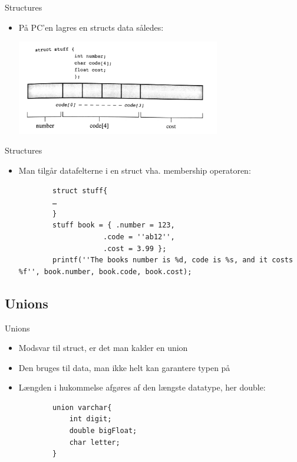 \documentclass{beamer}
\begin{document}
\begin{frame}[fragile]{Structures}
	\begin{itemize}
		\item{På PC'en lagres en structs data således:}
		\begin{center}
		\includegraphics[width=0.7\textwidth]{assets/struct_representation.jpg}
		\end{center}
	\end{itemize}
\end{frame}


\begin{frame}[fragile]{Structures}
	\begin{itemize}
		\item{Man tilgår datafelterne i en struct vha. membership operatoren:}
		\begin{lstlisting}
		struct stuff{
		…
		}
		stuff book = { .number = 123,
					.code = ''ab12'',
					.cost = 3.99 };
		printf(''The books number is %d, code is %s, and it costs %f'', book.number, book.code, book.cost);
		\end{lstlisting}
	\end{itemize}
\end{frame}

\subsection{Unions}

\begin{frame}[fragile]{Unions}
	\begin{itemize}
		\item{Modsvar til {\color{C_darkblue}struct}, er det man kalder en {\color{C_darkblue}union}}
		\item{Den bruges til data, man ikke helt kan garantere typen på}
		\item{Længden i hukommelse afgøres af den længste datatype, her double:}
		\begin{lstlisting}
		union varchar{
			int digit;
			double bigFloat;
			char letter;
		}
		\end{lstlisting}
	\end{itemize}
\end{frame}
\end{document}
